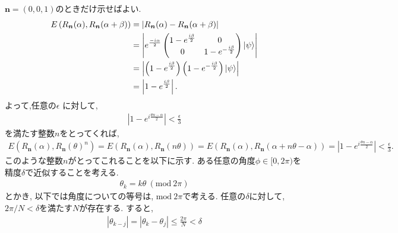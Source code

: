 \begin{ex}
    \label{ex4.40}
    $\bm{n} = (0,0,1)$のときだけ示せばよい.
    \begin{align*}
        E \left( R_{\bm{n}}(\alpha) , R_{\bm{n}}(\alpha + \beta)\right)
         & =
        \left| R_{\bm{n}}(\alpha) - R_{\bm{n}}(\alpha + \beta)\right| \\
         & =
        \left|
        e^{\frac{-i\alpha}{2}}
        \begin{pmatrix}
            1 - e^{\frac{i \beta}{2}} & 0                            \\
            0                         & 1 - e^{{-\frac{i \beta}{2}}}
        \end{pmatrix}
        \ket{\psi}
        \right|                                                       \\
         & =
        \left|
        \left(1 - e^{\frac{i \beta}{2}}\right) \left( 1 - e^{{-\frac{i \beta}{2}}}\right)\ket{\psi}
        \right|                                                       \\
         & =
        \left|
        1 - e^{\frac{i \beta}{2}}
        \right|.
    \end{align*}
    よって,任意の$\epsilon$
    に対して,
    \begin{align*}
        \left| 1 - e^{i \frac{ \theta n  - \alpha}{2}} \right| < \frac{\epsilon}{3}
    \end{align*}
    を満たす整数$n$をとってくれば,
    \begin{align*}
        E \left( R_{\bm{n}}(\alpha) , R_{\bm{n}}(\theta)^n \right)
        = E \left( R_{\bm{n}}(\alpha) , R_{\bm{n}}(n\theta) \right)
        = E \left( R_{\bm{n}}(\alpha) , R_{\bm{n}}(\alpha + n \theta - \alpha) \right)
        = \left| 1 - e^{i \frac{ \theta n  - \alpha}{2}} \right| < \frac{\epsilon}{3}.
    \end{align*}
    このような整数$n$がとってこれることを以下に示す.
    ある任意の角度$\phi \in [0,2\pi)$を精度$\delta$で近似することを考える.
    \begin{align*}
        \theta_k = k \theta \ (\mathrm{mod} \ 2 \pi)
    \end{align*}
    とかき, 以下では角度についての等号は, $\mathrm{mod} \ 2 \pi$で考える. 任意の$\delta$に対して, $2 \pi / N < \delta$を満たす$N$が存在する.
    すると,
    \begin{align*}
        \left| \theta_{k-j} \right| = \left| \theta_k - \theta_j \right| \leq \frac{2 \pi}{N} < \delta
    \end{align*}

\end{ex}
